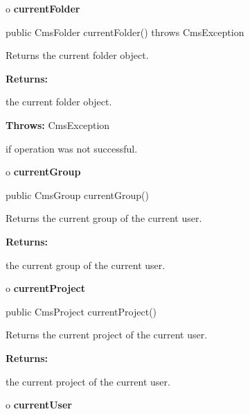 o {\bf currentFolder} 

\begin{PRE}
 public CmsFolder currentFolder() throws CmsException
\end{PRE}

\begin{description}
\htmlDD Returns the current folder object. 

\begin{description}
\item {\bf Returns:}  

the current folder object.  
\item {\bf Throws:} CmsException  

if operation was not successful.  
\end{description}

\end{description}

o {\bf currentGroup} 

\begin{PRE}
 public CmsGroup currentGroup()
\end{PRE}

\begin{description}
\htmlDD Returns the current group of the current user. 

\begin{description}
\item {\bf Returns:}  

the current group of the current user.  
\end{description}

\end{description}

o {\bf currentProject} 

\begin{PRE}
 public CmsProject currentProject()
\end{PRE}

\begin{description}
\htmlDD Returns the current project of the current user. 

\begin{description}
\item {\bf Returns:}  

the current project of the current user.  
\end{description}

\end{description}

o {\bf currentUser} 

